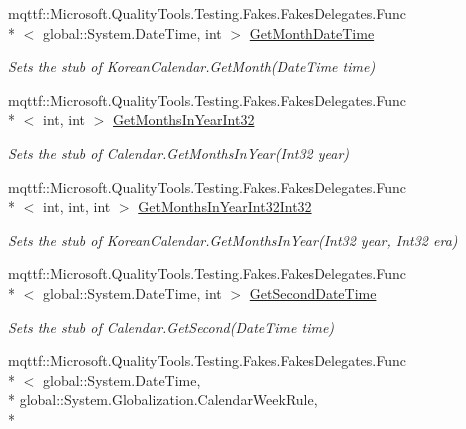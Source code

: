 \begin{DoxyCompactItemize}
mqttf\-::\-Microsoft.\-Quality\-Tools.\-Testing.\-Fakes.\-Fakes\-Delegates.\-Func\\*
$<$ global\-::\-System.\-Date\-Time, int $>$ \hyperlink{class_system_1_1_globalization_1_1_fakes_1_1_stub_korean_calendar_a57aa8c9bd31a1f10a0b6b30f861277d2}{Get\-Month\-Date\-Time}
\begin{DoxyCompactList}\small\item\em Sets the stub of Korean\-Calendar.\-Get\-Month(\-Date\-Time time)\end{DoxyCompactList}\item 
mqttf\-::\-Microsoft.\-Quality\-Tools.\-Testing.\-Fakes.\-Fakes\-Delegates.\-Func\\*
$<$ int, int $>$ \hyperlink{class_system_1_1_globalization_1_1_fakes_1_1_stub_korean_calendar_abad62e1a11e751db14357b09ed73500a}{Get\-Months\-In\-Year\-Int32}
\begin{DoxyCompactList}\small\item\em Sets the stub of Calendar.\-Get\-Months\-In\-Year(\-Int32 year)\end{DoxyCompactList}\item 
mqttf\-::\-Microsoft.\-Quality\-Tools.\-Testing.\-Fakes.\-Fakes\-Delegates.\-Func\\*
$<$ int, int, int $>$ \hyperlink{class_system_1_1_globalization_1_1_fakes_1_1_stub_korean_calendar_ab2bd8029ee2a15300b1df1c4260d546f}{Get\-Months\-In\-Year\-Int32\-Int32}
\begin{DoxyCompactList}\small\item\em Sets the stub of Korean\-Calendar.\-Get\-Months\-In\-Year(\-Int32 year, Int32 era)\end{DoxyCompactList}\item 
mqttf\-::\-Microsoft.\-Quality\-Tools.\-Testing.\-Fakes.\-Fakes\-Delegates.\-Func\\*
$<$ global\-::\-System.\-Date\-Time, int $>$ \hyperlink{class_system_1_1_globalization_1_1_fakes_1_1_stub_korean_calendar_af7d4e0fbd8533a487a3ba0f8d89912f2}{Get\-Second\-Date\-Time}
\begin{DoxyCompactList}\small\item\em Sets the stub of Calendar.\-Get\-Second(\-Date\-Time time)\end{DoxyCompactList}\item 
mqttf\-::\-Microsoft.\-Quality\-Tools.\-Testing.\-Fakes.\-Fakes\-Delegates.\-Func\\*
$<$ global\-::\-System.\-Date\-Time, \\*
global\-::\-System.\-Globalization.\-Calendar\-Week\-Rule, \\*

\end{DoxyCompactItemize}
